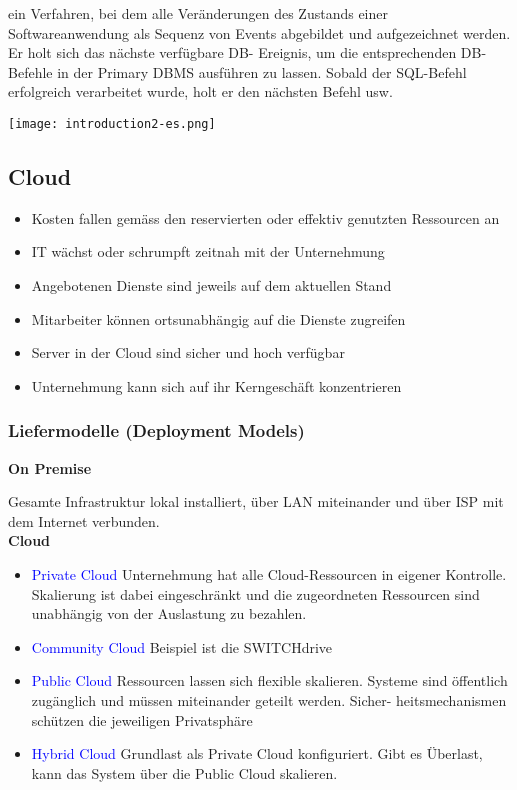 ein Verfahren, bei dem alle Veränderungen des Zustands einer Softwareanwendung als Sequenz von Events abgebildet und aufgezeichnet werden. Er holt sich das nächste verfügbare DB-
Ereignis, um die entsprechenden DB-Befehle in der Primary DBMS ausführen zu lassen. Sobald der SQL-Befehl erfolgreich verarbeitet wurde, holt er den nächsten Befehl usw.

\texttt{[image: introduction2-es.png]}

\subsection{Cloud}

\begin{itemize}
    \item Kosten fallen gemäss den reservierten oder effektiv genutzten Ressourcen an
    \item IT wächst oder schrumpft zeitnah mit der Unternehmung
    \item Angebotenen Dienste sind jeweils auf dem aktuellen Stand
    \item Mitarbeiter können ortsunabhängig auf die Dienste zugreifen
    \item Server in der Cloud sind sicher und hoch verfügbar
    \item Unternehmung kann sich auf ihr Kerngeschäft konzentrieren
\end{itemize}

\subsubsection{Liefermodelle (Deployment Models)}

\textbf{On Premise}

Gesamte Infrastruktur lokal installiert, über LAN miteinander und über ISP mit dem Internet verbunden. \\

\textbf{Cloud}

\begin{itemize}
    \item \textcolor{blue}{Private Cloud} Unternehmung hat alle Cloud-Ressourcen in eigener Kontrolle. Skalierung ist dabei eingeschränkt und die zugeordneten Ressourcen sind unabhängig von der Auslastung zu bezahlen.
    \item \textcolor{blue}{Community Cloud} Beispiel ist die SWITCHdrive
    \item \textcolor{blue}{Public Cloud} Ressourcen lassen sich flexible skalieren. Systeme sind öffentlich zugänglich und müssen miteinander geteilt werden. Sicher-
    heitsmechanismen schützen die jeweiligen Privatsphäre
    \item \textcolor{blue}{Hybrid Cloud} Grundlast als Private Cloud konfiguriert. Gibt es Überlast, kann das System über die Public Cloud skalieren.
\end{itemize}

